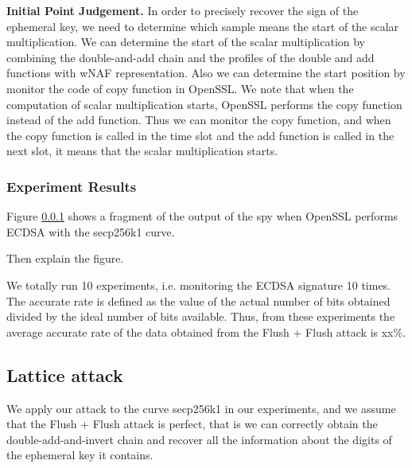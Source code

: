 \noindent\textbf{Initial Point Judgement.}
In order to precisely recover the sign of the ephemeral key, we need to determine which sample means the start of the scalar multiplication.
We can determine the
start of the scalar multiplication
by combining the double-and-add chain and the profiles of the double and add functions with wNAF representation.
Also we can determine the start position by monitor the code of copy function in OpenSSL.
 We note that when the computation of scalar multiplication starts, OpenSSL performs the copy function instead of the add function.
 Thus we can monitor the copy function, and when the copy function is called in the time slot and the add function is called in the next slot, it means that the scalar multiplication starts.


\subsubsection{Experiment Results}
Figure \ref{} shows a fragment of the output of the spy when OpenSSL performs ECDSA with the secp256k1 curve.

Then explain the figure.

We totally run 10 experiments, i.e. monitoring the ECDSA signature 10 times.
The accurate rate is defined as the value of the actual number of bits obtained divided by the ideal number of bits available.
Thus, from these experiments the average accurate rate of the data obtained from the Flush + Flush attack is xx\%.
 


%
%
%
%
%


\subsection{Lattice attack}
\label{latticeattack}
We apply our attack to the curve secp256k1 in our experiments, and we assume that the Flush + Flush attack is perfect, that is we can correctly obtain the double-add-and-invert chain and recover all the information about the digits of the ephemeral key it contains.

